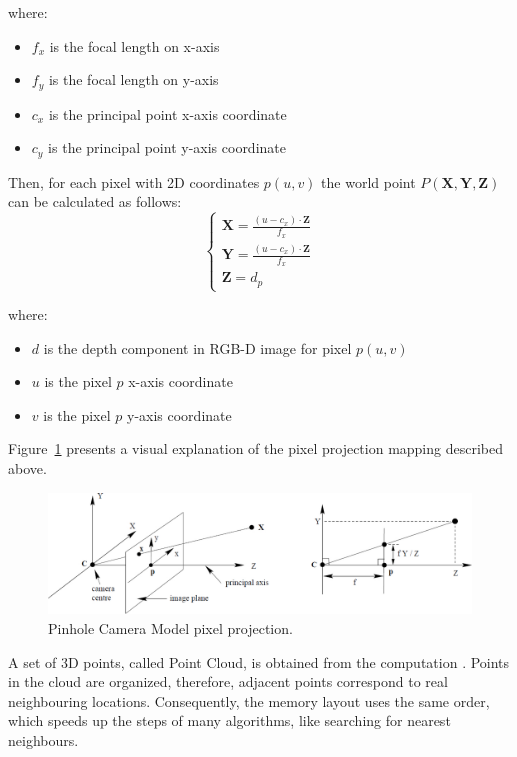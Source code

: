 where:
\begin{itemize}
\item $f_x$ is the focal length on x-axis
\item $f_y$ is the focal length on y-axis
\item $c_x$ is the principal point x-axis coordinate
\item $c_y$ is the principal point y-axis coordinate
\end{itemize}

Then, for each pixel with 2D coordinates $p(u,v)$
the world point $P(\mathbf{X},\mathbf{Y},\mathbf{Z})$ can be calculated as follows:
\begin{equation} \label{equation-world-point-calculation}
    \begin{cases}
        \mathbf{X} = \frac{( u - c_x ) \cdot \mathbf{Z}}{f_x} \\
        \mathbf{Y} = \frac{( u - c_x ) \cdot \mathbf{Z}}{f_x} \\
        \mathbf{Z} = d_p
    \end{cases}
\end{equation}

where:
\begin{itemize}
    \item $d$ is the depth component in RGB-D image for pixel $p(u,v)$
    \item $u$ is the pixel $p$ x-axis coordinate
    \item $v$ is the pixel $p$ y-axis coordinate
\end{itemize}

Figure~\ref{figure:Pinhole-Camera-Model} presents a visual explanation
of the pixel projection mapping described above.

\begin{figure}[H]
    \centering
    \includegraphics[width=1.0\textwidth]{images/psd/RGBD/Pinhole-Camera-Model.jpg}
    \caption{Pinhole Camera Model pixel projection. \cite{pinhole-camera-model}}
    \label{figure:Pinhole-Camera-Model}
\end{figure}

A set of 3D points, called Point Cloud, is obtained from the computation \cite{point-cloud}.
Points in the cloud are organized, therefore, adjacent points correspond to real neighbouring locations.
Consequently, the memory layout uses the same order, which speeds up the steps of many algorithms,
like searching for nearest neighbours.

